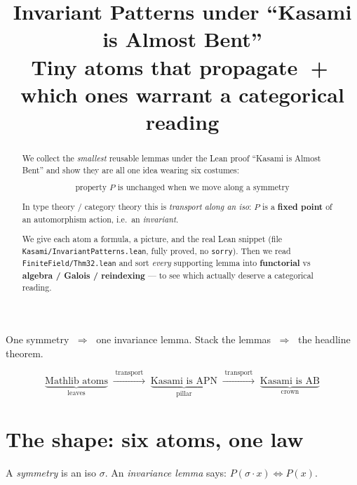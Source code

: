 \documentclass[11pt]{article}
\title{\bf Invariant Patterns under ``Kasami is Almost Bent''\\[3pt]
  \large Tiny atoms that propagate $\;$+$\;$ which ones warrant a categorical reading}
\author{}
\date{}
\begin{document}
\maketitle

\begin{abstract}\noindent
We collect the \emph{smallest} reusable lemmas under the Lean proof
``Kasami is Almost Bent'' and show they are all one idea wearing six costumes:

\[
  \boxed{\;\text{property } P \text{ is unchanged when we move along a symmetry}\;}
\]

In type theory / category theory this is \emph{transport along an iso}:
$P$ is a \textbf{fixed point} of an automorphism action, i.e.\ an \emph{invariant}.

We give each atom a formula, a picture, and the real Lean snippet
(file \texttt{Kasami/InvariantPatterns.lean}, fully proved, no \texttt{sorry}).
Then we read \texttt{FiniteField/Thm32.lean} and sort \emph{every} supporting
lemma into \textbf{functorial} vs \textbf{algebra / Galois / reindexing} ---
to see which actually deserve a categorical reading.
\end{abstract}

\bigskip

\begin{bigidea}
One symmetry $\;\Rightarrow\;$ one invariance lemma.
Stack the lemmas $\;\Rightarrow\;$ the headline theorem.

\[
  \underbrace{\text{Mathlib atoms}}_{\text{leaves}}
  \;\xrightarrow{\;\text{transport}\;}\;
  \underbrace{\text{Kasami is APN}}_{\text{pillar}}
  \;\xrightarrow{\;\text{transport}\;}\;
  \underbrace{\text{Kasami is AB}}_{\text{crown}}
\]
\end{bigidea}

\section{The shape: six atoms, one law}

A \emph{symmetry} is an iso $\sigma$.
An \emph{invariance lemma} says: $P(\sigma\!\cdot\! x)\iff P(x)$.
\end{document}
